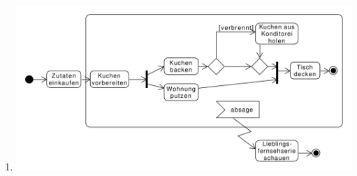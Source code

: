 \documentclass[a4paper, 12pt, margins=2.5cm]{homework}
\begin{document}
\begin{solution}
\begin{enumerate}[label=\alph*)]
      \item \hfill
        \begin{center}
          \includegraphics[scale=0.55]{Aufgabe3c.pdf}
        \end{center}
    \end{enumerate}
  \end{solution}
  
  
  \begin{problem}
    
  \end{problem}
  \begin{solution}
    
  \end{solution}
  
  
  \begin{problem}
    
  \end{problem}
  \begin{solution}
    
  \end{solution}
\end{document}

